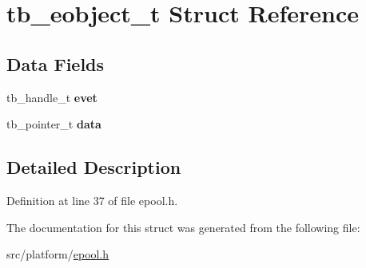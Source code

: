 \hypertarget{structtb__eobject__t}{\section{tb\-\_\-eobject\-\_\-t Struct Reference}
\label{structtb__eobject__t}
}
\subsection*{Data Fields}
\begin{DoxyCompactItemize}
\item 
\hypertarget{structtb__eobject__t_a77dbd4ed36da0a0b88c75e89758f5f33}{tb\-\_\-handle\-\_\-t {\bfseries evet}}\label{structtb__eobject__t_a77dbd4ed36da0a0b88c75e89758f5f33}

\item 
\hypertarget{structtb__eobject__t_a94778da6517c10465cb971ec522b7d53}{tb\-\_\-pointer\-\_\-t {\bfseries data}}\label{structtb__eobject__t_a94778da6517c10465cb971ec522b7d53}

\end{DoxyCompactItemize}


\subsection{Detailed Description}


Definition at line 37 of file epool.\-h.



The documentation for this struct was generated from the following file\-:\begin{DoxyCompactItemize}
\item 
src/platform/\hyperlink{epool_8h}{epool.\-h}\end{DoxyCompactItemize}
